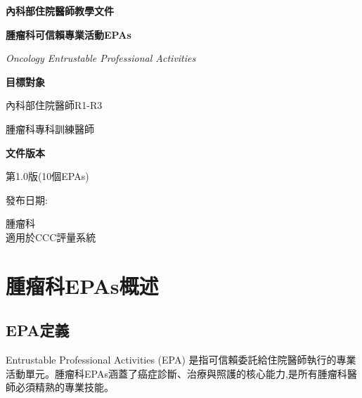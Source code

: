 \documentclass[12pt,a4paper]{article}
\newcommand{\mydate}{\DTMtoday}
\begin{document}
\begin{titlepage}
    \centering
    {\LARGE\textcolor{onco_teal}{\textbf{內科部住院醫師教學文件}}\par}
    \vspace{1cm}
    {\huge\bfseries 腫瘤科可信賴專業活動EPAs\par}
    \vspace{0.5cm}
    {\Large\textcolor{onco_gold}{\textit{Oncology Entrustable Professional Activities}}\par}
    \vspace{1cm}
    
    \begin{tcolorbox}[
        colback=onco_gold!5!white,
        colframe=onco_gold,
        width=0.8\textwidth,
        arc=10pt,
        boxrule=1pt
    ]
    \centering
    {\large\textbf{目標對象}\par}
    \vspace{0.3cm}
    內科部住院醫師R1-R3\par
    腫瘤科專科訓練醫師\par
    \vspace{0.5cm}
    {\large\textbf{文件版本}\par}
    \vspace{0.3cm}
    第1.0版(10個EPAs)\par
    發布日期:\mydate\par
    \end{tcolorbox}

    \vfill
    
    {\large 腫瘤科 \\
    適用於CCC評量系統\par}
    
    \vspace{0.5cm}
\end{titlepage}

\newpage
\tableofcontents
\newpage

\section{腫瘤科EPAs概述}

\subsection{EPA定義}
Entrustable Professional Activities (EPA) 是指可信賴委託給住院醫師執行的專業活動單元。腫瘤科EPAs涵蓋了癌症診斷、治療與照護的核心能力,是所有腫瘤科醫師必須精熟的專業技能。
\end{document}
